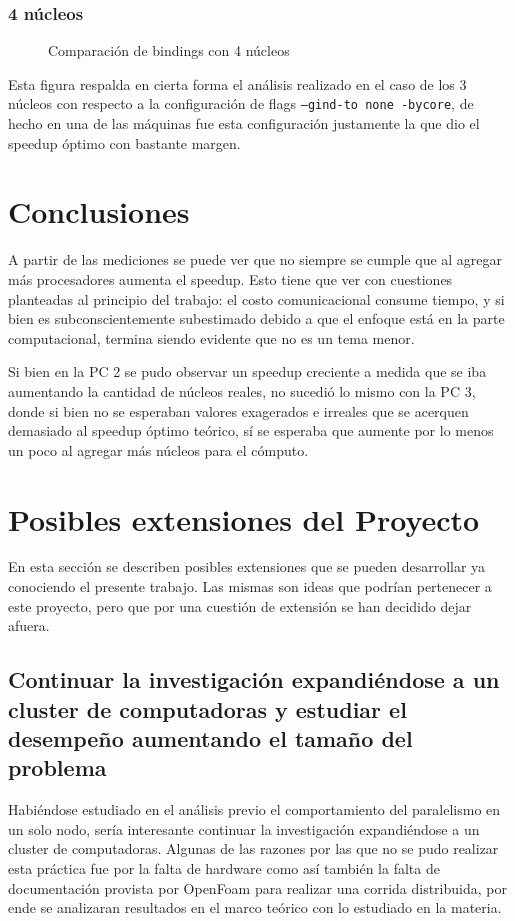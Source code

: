 \documentclass{article}
\begin{document}
\subsubsection{4 núcleos}
\begin{figure}[H]
    
    \caption{Comparación de bindings con 4 núcleos}
\end{figure}
Esta figura respalda en cierta forma el análisis realizado en el caso de los 3 núcleos con respecto a la configuración de flags \texttt{--gind-to none -bycore}, de hecho en una de las máquinas fue esta configuración justamente la que dio el speedup óptimo con bastante margen.

\newpage
\section{Conclusiones}
A partir de las mediciones se puede ver que no siempre se cumple que al agregar más procesadores aumenta el speedup. Esto tiene que ver con cuestiones planteadas al principio del trabajo: el costo comunicacional consume tiempo, y si bien es subconscientemente subestimado debido a que el enfoque está en la parte computacional, termina siendo evidente que no es un tema menor. 

Si bien en la PC 2 se pudo observar un speedup creciente a medida que se iba aumentando la cantidad de núcleos reales, no sucedió lo mismo con la PC 3, donde si bien no se esperaban valores exagerados e irreales que se acerquen demasiado al speedup óptimo teórico, sí se esperaba que aumente por lo menos un poco al agregar más núcleos para el cómputo.

\newpage
\section{Posibles extensiones del Proyecto}
En esta sección se describen posibles extensiones que se pueden desarrollar ya conociendo el presente trabajo. Las mismas son ideas que podrían pertenecer a este proyecto, pero que por una cuestión de extensión se han decidido dejar afuera.
\subsection{Continuar la investigación expandiéndose a un cluster de computadoras y estudiar el desempeño aumentando el tamaño del problema}
Habiéndose estudiado en el análisis previo el comportamiento del paralelismo en un solo nodo, sería interesante continuar la investigación expandiéndose a un cluster de computadoras. Algunas de las razones por las que no se pudo realizar esta práctica fue por la falta de hardware como así también la falta de documentación provista por OpenFoam para realizar una corrida distribuida, por ende se analizaran resultados en el marco teórico con lo estudiado en la materia.
\end{document}
